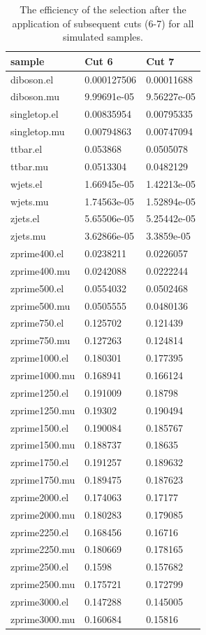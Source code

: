 \begin{table}[H]
  \centering
  \begin{tabular}{l|ll}
      sample           & Cut 6  & Cut 7 \\
      \hline
      diboson.el    & 0.000127506 & 0.00011688  \\
      diboson.mu    & 9.99691e-05 & 9.56227e-05 \\
      singletop.el  & 0.00835954  & 0.00795335  \\
      singletop.mu  & 0.00794863  & 0.00747094  \\
      ttbar.el      & 0.053868    & 0.0505078   \\
      ttbar.mu      & 0.0513304   & 0.0482129   \\
      wjets.el      & 1.66945e-05 & 1.42213e-05 \\
      wjets.mu      & 1.74563e-05 & 1.52894e-05 \\
      zjets.el      & 5.65506e-05 & 5.25442e-05 \\
      zjets.mu      & 3.62866e-05 & 3.3859e-05  \\
      zprime400.el  & 0.0238211   & 0.0226057   \\
      zprime400.mu  & 0.0242088   & 0.0222244   \\
      zprime500.el  & 0.0554032   & 0.0502468   \\
      zprime500.mu  & 0.0505555   & 0.0480136   \\
      zprime750.el  & 0.125702    & 0.121439    \\
      zprime750.mu  & 0.127263    & 0.124814    \\
      zprime1000.el & 0.180301    & 0.177395    \\
      zprime1000.mu & 0.168941    & 0.166124    \\
      zprime1250.el & 0.191009    & 0.18798     \\
      zprime1250.mu & 0.19302     & 0.190494    \\
      zprime1500.el & 0.190084    & 0.185767    \\
      zprime1500.mu & 0.188737    & 0.18635     \\
      zprime1750.el & 0.191257    & 0.189632    \\
      zprime1750.mu & 0.189475    & 0.187623    \\
      zprime2000.el & 0.174063    & 0.17177     \\
      zprime2000.mu & 0.180283    & 0.179085    \\
      zprime2250.el & 0.168456    & 0.16716     \\
      zprime2250.mu & 0.180669    & 0.178165    \\
      zprime2500.el & 0.1598      & 0.157682    \\
      zprime2500.mu & 0.175721    & 0.172799    \\
      zprime3000.el & 0.147288    & 0.145005    \\
      zprime3000.mu & 0.160684    & 0.15816     
      \end{tabular}
\caption{The efficiency of the selection after the application of subsequent cuts (6-7) for all simulated samples.}
\label{tab:eff_b}


\end{table}
